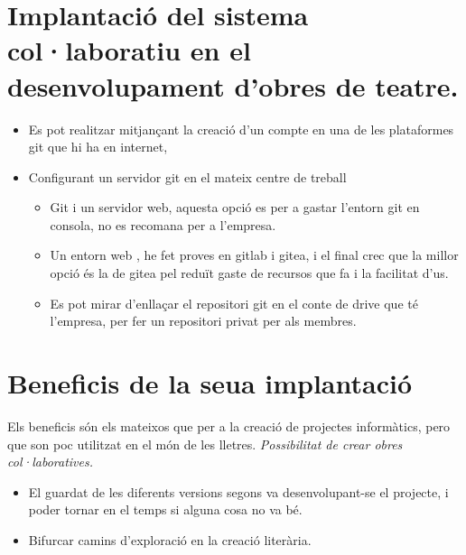 \documentclass[
  10pt,
]{krantz}
\providecommand{\tightlist}{%
  \setlength{\itemsep}{0pt}\setlength{\parskip}{0pt}}
\begin{document}
\hypertarget{implantaciuxf3-del-sistema-collaboratiu-en-el-desenvolupament-dobres-de-teatre.}{%
\section{Implantació del sistema col·laboratiu en el desenvolupament d'obres de teatre.}\label{implantaciuxf3-del-sistema-collaboratiu-en-el-desenvolupament-dobres-de-teatre.}}

\begin{itemize}
\tightlist
\item
  Es pot realitzar mitjançant la creació d'un compte en una de les plataformes git que hi ha en internet,
\item
  Configurant un servidor git en el mateix centre de treball

  \begin{itemize}
  \tightlist
  \item
    Git i un servidor web, aquesta opció es per a gastar l'entorn git en consola, no es recomana per a l'empresa.
  \item
    Un entorn web , he fet proves en gitlab i gitea, i el final crec que la millor opció és la de gitea pel reduït gaste de recursos que fa i la facilitat d'us.
  \item
    Es pot mirar d'enllaçar el repositori git en el conte de drive que té l'empresa, per fer un repositori privat per als membres.
  \end{itemize}
\end{itemize}

\hypertarget{beneficis-de-la-seua-implantaciuxf3}{%
\section{Beneficis de la seua implantació}\label{beneficis-de-la-seua-implantaciuxf3}}

Els beneficis són els mateixos que per a la creació de projectes informàtics, pero que son poc utilitzat en el món de les lletres. \emph{Possibilitat de crear obres col·laboratives.}

\begin{itemize}
\tightlist
\item
  El guardat de les diferents versions segons va desenvolupant-se el projecte, i poder tornar en el temps si alguna cosa no va bé.
\item
  Bifurcar camins d'exploració en la creació literària.
\end{itemize}
\end{document}
